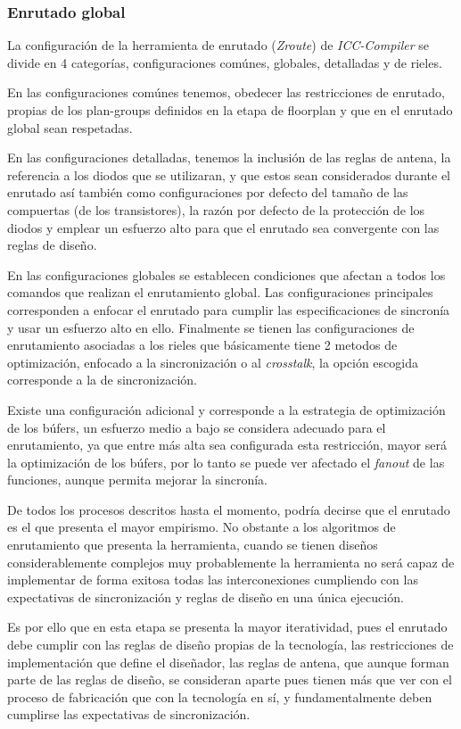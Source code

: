 \subsubsection*{Enrutado global}

La configuración de la herramienta de enrutado (\textit{Zroute}) de \textit{ICC-Compiler} se divide en 4 categorías, configuraciones comúnes, globales, detalladas y de rieles.

En las configuraciones comúnes tenemos, obedecer las restricciones de enrutado, propias de los plan-groups definidos en la etapa de floorplan y que en el enrutado global sean respetadas.

En las configuraciones detalladas, tenemos la inclusión de las reglas de antena, la referencia a los diodos que se utilizaran, y que estos sean considerados durante el enrutado así también como configuraciones por defecto del tamaño de las compuertas (de los transistores), la razón por defecto de la protección de los diodos y emplear un esfuerzo alto para que el enrutado sea convergente con las reglas de diseño.

En las configuraciones globales se establecen condiciones que afectan a todos los comandos que realizan el enrutamiento global. Las configuraciones principales corresponden a enfocar el enrutado para cumplir las especificaciones de sincronía y usar un esfuerzo alto en ello. Finalmente se tienen las configuraciones de enrutamiento asociadas a los rieles que básicamente tiene 2 metodos de optimización, enfocado a la sincronización o al \textit{crosstalk}, la opción escogida corresponde a la de sincronización.

Existe una configuración adicional y corresponde a la estrategia de optimización de los búfers, un esfuerzo medio a bajo se considera adecuado para el enrutamiento, ya que entre más alta sea configurada esta restricción, mayor será la optimización de los búfers, por lo tanto se puede ver afectado el \textit{fanout} de las funciones, aunque permita mejorar la sincronía.

De todos los procesos descritos hasta el momento, podría decirse que el enrutado es el que presenta el mayor empirismo. No obstante a los algoritmos de enrutamiento que presenta la herramienta, cuando se tienen diseños considerablemente complejos muy probablemente la herramienta no será capaz de implementar de forma exitosa todas las interconexiones cumpliendo con las expectativas de sincronización y reglas de diseño en una única ejecución.

Es por ello que en esta etapa se presenta la mayor iteratividad, pues el enrutado debe cumplir con las reglas de diseño propias de la tecnología, las restricciones de implementación que define el diseñador, las reglas de antena, que aunque forman parte de las reglas de diseño, se consideran aparte pues tienen más que ver con el proceso de fabricación que con la tecnología en sí, y fundamentalmente deben cumplirse las expectativas de sincronización.

